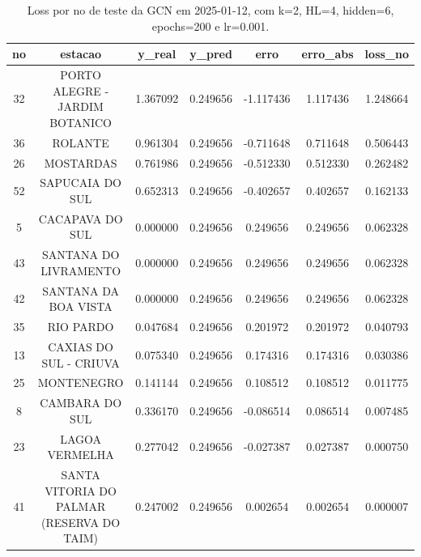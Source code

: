 \begin{table}[h]
\centering
\caption{Loss por no de teste da GCN em 2025-01-12, com k=2, HL=4, hidden=6, epochs=200 e lr=0.001.}
\label{tab:gcn_loss_k2_hl4_h6_e200_d20250112}
\begin{tabular}{ccccccc}
\toprule
no & estacao & y\_real & y\_pred & erro & erro\_abs & loss\_no \\
\midrule
32 & PORTO ALEGRE - JARDIM BOTANICO & 1.367092 & 0.249656 & -1.117436 & 1.117436 & 1.248664 \\
36 & ROLANTE & 0.961304 & 0.249656 & -0.711648 & 0.711648 & 0.506443 \\
26 & MOSTARDAS & 0.761986 & 0.249656 & -0.512330 & 0.512330 & 0.262482 \\
52 & SAPUCAIA DO SUL & 0.652313 & 0.249656 & -0.402657 & 0.402657 & 0.162133 \\
5 & CACAPAVA DO SUL & 0.000000 & 0.249656 & 0.249656 & 0.249656 & 0.062328 \\
43 & SANTANA DO LIVRAMENTO & 0.000000 & 0.249656 & 0.249656 & 0.249656 & 0.062328 \\
42 & SANTANA DA BOA VISTA & 0.000000 & 0.249656 & 0.249656 & 0.249656 & 0.062328 \\
35 & RIO PARDO & 0.047684 & 0.249656 & 0.201972 & 0.201972 & 0.040793 \\
13 & CAXIAS DO SUL - CRIUVA & 0.075340 & 0.249656 & 0.174316 & 0.174316 & 0.030386 \\
25 & MONTENEGRO & 0.141144 & 0.249656 & 0.108512 & 0.108512 & 0.011775 \\
8 & CAMBARA DO SUL & 0.336170 & 0.249656 & -0.086514 & 0.086514 & 0.007485 \\
23 & LAGOA VERMELHA & 0.277042 & 0.249656 & -0.027387 & 0.027387 & 0.000750 \\
41 & SANTA VITORIA DO PALMAR (RESERVA DO TAIM) & 0.247002 & 0.249656 & 0.002654 & 0.002654 & 0.000007 \\
\bottomrule
\end{tabular}
\end{table}
